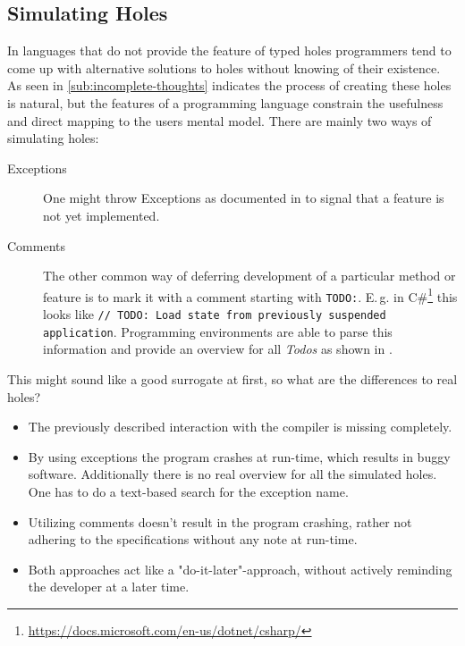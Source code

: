 \subsection{Simulating Holes}
In languages that do not provide the feature of typed holes programmers tend to come up with alternative solutions to holes without knowing of their existence.
As seen in \cref{sub:incomplete-thoughts} indicates the process of creating these holes is natural, but the features of a programming language constrain the usefulness and direct mapping to the users mental model.
There are mainly two ways of simulating holes:
\begin{description}
\item[Exceptions] One might throw Exceptions as documented in \textcite{microsoft_notimplementedexception_2020} to signal that a feature is not yet implemented.
\item[Comments] The other common way of deferring development of a particular method or feature is to mark it with a comment starting with \verb|TODO:|. E.\,g. in C\#\footnote{\url{https://docs.microsoft.com/en-us/dotnet/csharp/}} this looks like \verb|// TODO: Load state from previously suspended application|. Programming environments are able to parse this information and provide an overview for all \emph{Todos} as shown in \textcite{hogensen_use_2019}.
\end{description}
This might sound like a good surrogate at first, so what are the differences to real holes?
\begin{itemize}
    \item The previously described interaction with the compiler is missing completely.
    \item By using exceptions the program crashes at run-time, which results in buggy software. Additionally there is no real overview for all the simulated holes. One has to do a text-based search for the exception name.
    \item Utilizing comments doesn't result in the program crashing, rather not adhering to the specifications without any note at run-time.
    \item Both approaches act like a "do-it-later"-approach, without actively reminding the developer at a later time.
\end{itemize}

